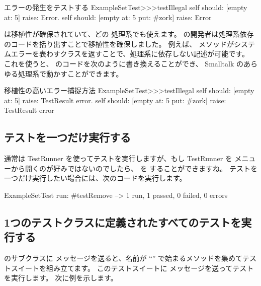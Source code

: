 \documentclass[a4paper,10pt,twoside]{book}
\begin{document}
\begin{method}[ESTtestIllegal]{エラーの発生をテストする}
ExampleSetTest>>>testIllegal
	self should: [empty at: 5] raise: Error.
	self should: [empty at: 5 put: #zork] raise: Error
\end{method}

\sunit は移植性が確保されていて、どの \st 処理系でも使えます。
\sunit の開発者は処理系依存のコードを括り出すことで移植性を確保しました。
例えば、  メソッドがシステムエラーを表わすクラスを返すことで、処理系に依存しない記述が可能です。
これを使うと、  のコードを次のように書き換えることができ、 Smalltalk のあらゆる処理系で動かすことができます。

\begin{method}[portabletestillegal]{移植性の高いエラー捕捉方法}
ExampleSetTest>>>testIllegal
	self should: [empty at: 5] raise: TestResult error.
	self should: [empty at: 5 put: #zork] raise: TestResult error
\end{method}


\subsection{テストを一つだけ実行する}

通常は TestRunner を使ってテストを実行しますが、もし TestRunner を  メニューから開くのが好みではないのでしたら、  を  することができますね。
テストを一つだけ実行したい場合には、次のコードを実行します。

\begin{code}{}
ExampleSetTest run: #testRemove --> 1 run, 1 passed, 0 failed, 0 errors
\end{code}

\subsection{1つのテストクラスに定義されたすべてのテストを実行する}

 のサブクラスに  メッセージを送ると、名前が ``'' で始まるメソッドを集めてテストスイートを組み立てます。
このテストスイートに  メッセージを送ってテストを実行します。
次に例を示します。
\end{document}
